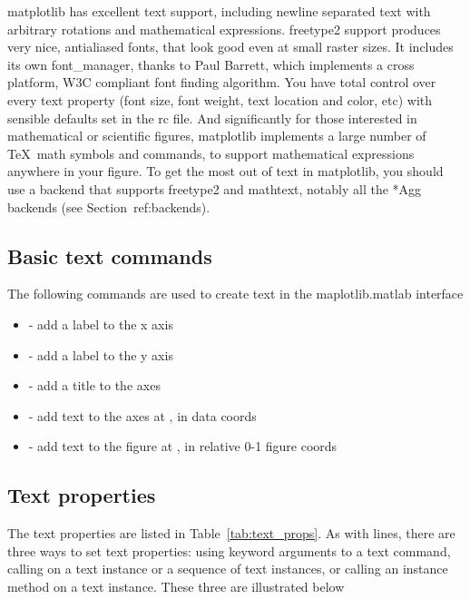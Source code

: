 \documentclass[]{book}
\begin{document}
matplotlib has excellent text support, including newline separated
text with arbitrary rotations and mathematical expressions.  freetype2
support produces very nice, antialiased fonts, that look good even at
small raster sizes.  It includes its own font\_manager, thanks to Paul
Barrett, which implements a cross platform, W3C compliant font finding
algorithm.  You have total control over every text property (font
size, font weight, text location and color, etc) with sensible
defaults set in the rc file.  And significantly for those interested
in mathematical or scientific figures, matplotlib implements a large
number of \TeX\ math symbols and commands, to support mathematical
expressions anywhere in your figure.  To get the most out of text in
matplotlib, you should use a backend that supports freetype2 and
mathtext, notably all the *Agg backends (see Section~{ref:backends}).

\subsection{Basic text commands}
\label{sec:basic_text}

The following commands are used to create text in the maplotlib.matlab
interface

\begin{itemize}
  \item {} - add a label  to the x axis
  \item {} - add a label  to the y axis
  \item {} - add a title  to the axes
  \item {} - add text  to the axes at
    ,  in data coords
  \item {} - add text to the figure at ,
     in relative 0-1 figure coords
\end{itemize}



\subsection{Text properties}
\label{sec:text_props}

The text properties are listed in Table~\ref{tab:text_props}.  As with
lines, there are three ways to set text properties: using keyword
arguments to a text command, calling  on a text instance or
a sequence of text instances, or calling an instance method on a text
instance.  These three are illustrated below
\end{document}
